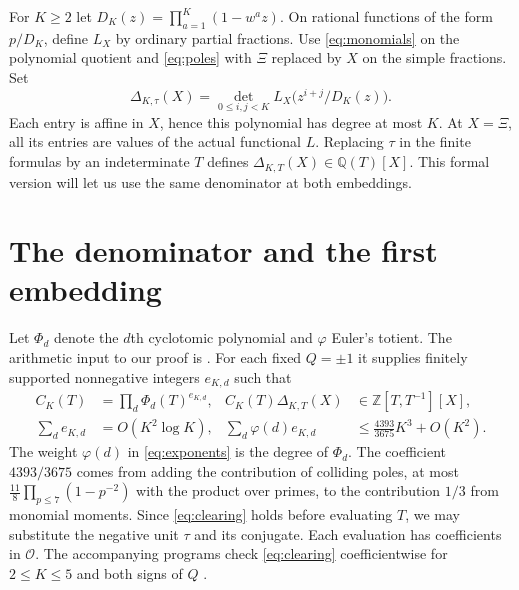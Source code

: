 \documentclass[11pt,letterpaper]{article}
\numberwithin{equation}{section}
\newcommand{\Q}{\mathbb Q}
\newcommand{\Z}{\mathbb Z}
\newcommand{\Ord}{\mathcal O}
\begin{document}
For \(K\ge2\) let \(D_K(z)=\prod_{a=1}^K(1-w^a z)\). On rational
functions of the form \(p/D_K\), define \(L_X\) by ordinary partial
fractions. Use \eqref{eq:monomials} on the polynomial quotient and
\eqref{eq:poles} with \(\Xi\) replaced by \(X\) on the simple fractions.
Set
\begin{equation}\label{eq:det}
           \Delta_{K,\tau}(X)
            =\det_{0\le i,j<K} L_X\big(z^{i+j}/D_K(z)\big).
\end{equation}
Each entry is affine in \(X\), hence this polynomial has degree at
most \(K\). At \(X=\Xi\), all its entries are values of the actual
functional \(L\). Replacing \(\tau\) in the finite formulas by an
indeterminate \(T\) defines \(\Delta_{K,T}(X)\in\Q(T)[X]\). This
formal version will let us use the same denominator at both embeddings.

\section{The denominator and the first embedding}\label{sec:first}

Let \(\Phi_d\) denote the \(d\)th cyclotomic polynomial and \(\varphi\)
Euler's totient. The arithmetic input to our proof is
\cite[Proposition~4.4 and the proof of Proposition~4.6]{KLucas}.
For each fixed \(Q=\pm1\) it supplies finitely supported nonnegative
integers \(e_{K,d}\) such that
\begin{align}
 C_K(T)&=\prod_d\Phi_d(T)^{e_{K,d}},&
                 C_K(T)\Delta_{K,T}(X)&\in\Z[T,T^{-1}][X],
                 \label{eq:clearing}\\
 \sum_d e_{K,d}&=O(K^2\log K),&
 \sum_d\varphi(d)e_{K,d}&\le\frac{4393}{3675}K^3+O(K^2).
                 \label{eq:exponents}
\end{align}
The weight \(\varphi(d)\) in \eqref{eq:exponents} is the degree of
\(\Phi_d\). The coefficient \(4393/3675\) comes from adding the
contribution of colliding poles, at most
\(\tfrac{11}{8}\prod_{p\le7}(1-p^{-2})\) with the product over primes,
to the contribution \(1/3\) from monomial moments. Since
\eqref{eq:clearing} holds before evaluating \(T\), we may substitute
the negative unit \(\tau\) and its conjugate. Each evaluation has
coefficients in \(\Ord\). The accompanying programs check
\eqref{eq:clearing} coefficientwise for \(2\le K\le5\) and both
signs of \(Q\) \cite{checks}.
\end{document}
